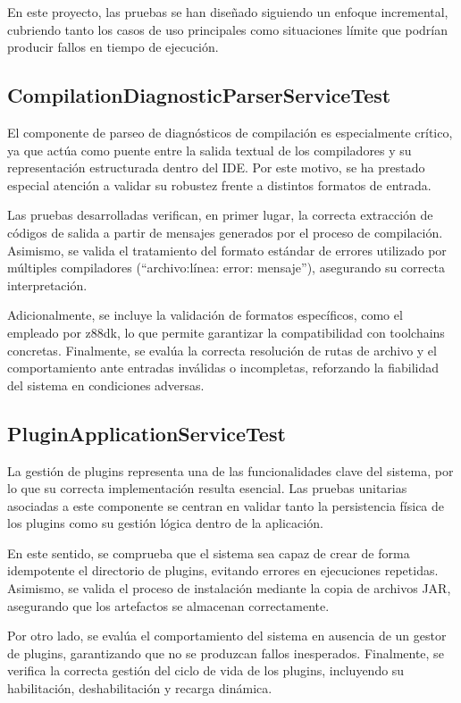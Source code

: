 \documentclass[../../main.tex]{subfiles}
\begin{document}
En este proyecto, las pruebas se han diseñado siguiendo un enfoque incremental, cubriendo tanto los casos de uso principales como situaciones límite que podrían producir fallos en tiempo de ejecución.

\subsection{CompilationDiagnosticParserServiceTest}

El componente de parseo de diagnósticos de compilación es especialmente crítico, ya que actúa como puente entre la salida textual de los compiladores y su representación estructurada dentro del IDE. Por este motivo, se ha prestado especial atención a validar su robustez frente a distintos formatos de entrada.

Las pruebas desarrolladas verifican, en primer lugar, la correcta extracción de códigos de salida a partir de mensajes generados por el proceso de compilación. Asimismo, se valida el tratamiento del formato estándar de errores utilizado por múltiples compiladores (``archivo:línea: error: mensaje''), asegurando su correcta interpretación.

Adicionalmente, se incluye la validación de formatos específicos, como el empleado por z88dk, lo que permite garantizar la compatibilidad con toolchains concretas. Finalmente, se evalúa la correcta resolución de rutas de archivo y el comportamiento ante entradas inválidas o incompletas, reforzando la fiabilidad del sistema en condiciones adversas.

\subsection{PluginApplicationServiceTest}

La gestión de plugins representa una de las funcionalidades clave del sistema, por lo que su correcta implementación resulta esencial. Las pruebas unitarias asociadas a este componente se centran en validar tanto la persistencia física de los plugins como su gestión lógica dentro de la aplicación.

En este sentido, se comprueba que el sistema sea capaz de crear de forma idempotente el directorio de plugins, evitando errores en ejecuciones repetidas. Asimismo, se valida el proceso de instalación mediante la copia de archivos JAR, asegurando que los artefactos se almacenan correctamente.

Por otro lado, se evalúa el comportamiento del sistema en ausencia de un gestor de plugins, garantizando que no se produzcan fallos inesperados. Finalmente, se verifica la correcta gestión del ciclo de vida de los plugins, incluyendo su habilitación, deshabilitación y recarga dinámica.
\end{document}
